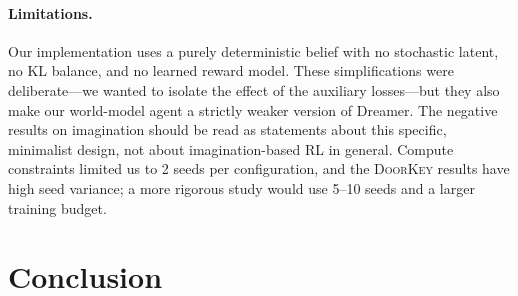 \documentclass[letterpaper]{article}
\begin{document}
\paragraph{Limitations.}
Our implementation uses a purely deterministic belief with no stochastic
latent, no KL balance, and no learned reward model. These simplifications
were deliberate---we wanted to isolate the effect of the auxiliary
losses---but they also make our world-model agent a strictly weaker
version of Dreamer. The negative results on imagination should be read as
statements about this specific, minimalist design, not about
imagination-based RL in general. Compute constraints limited us to
2 seeds per configuration, and the \textsc{DoorKey} results
have high seed variance; a more rigorous study would use 5--10 seeds and
a larger training budget.

\section{Conclusion}
\end{document}
